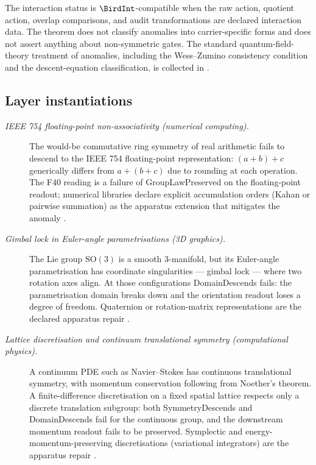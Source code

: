 \documentclass[11pt]{article}
\theoremstyle{definition}
\begin{document}
The interaction status is \(\BirdInt\)-compatible when the raw action,
quotient action, overlap comparisons, and audit transformations are
declared interaction data.  The theorem does not classify anomalies
into carrier-specific forms and does not assert anything about
non-symmetric gates.  The standard quantum-field-theory treatment of
anomalies, including the Wess--Zumino consistency condition and the
descent-equation classification, is collected in
\citet{Bertlmann2000Anomalies}.

\subsection*{Layer instantiations}\label{layer-inst:F40}

\begin{description}
\item[\emph{{IEEE} 754 floating-point non-associativity (numerical
computing).}]
The would-be commutative ring symmetry of real arithmetic fails to
descend to the IEEE 754 floating-point representation:
\((a+b)+c\) generically differs from \(a+(b+c)\) due to rounding
at each operation.  The F40 reading is a failure of
GroupLawPreserved on the floating-point readout; numerical
libraries declare explicit accumulation orders (Kahan or
pairwise summation) as the apparatus extension that mitigates the
anomaly
\citep{IEEE7542019FloatingPoint}.

\item[\emph{Gimbal lock in Euler-angle parametrisations
(3D graphics).}]
The Lie group \(\mathrm{SO}(3)\) is a smooth 3-manifold, but its
Euler-angle parametrisation has coordinate singularities --- gimbal
lock --- where two rotation axes align.  At those configurations
DomainDescends fails: the parametrisation domain breaks down and
the orientation readout loses a degree of freedom.  Quaternion or
rotation-matrix representations are the declared apparatus repair
\citep{Kuipers1999QuaternionsRotationSequences}.

\item[\emph{Lattice discretisation and continuum
translational symmetry (computational physics).}]
A continuum PDE such as Navier--Stokes has continuous translational
symmetry, with momentum conservation following from Noether's
theorem.  A finite-difference discretisation on a fixed spatial
lattice respects only a discrete translation subgroup: both
SymmetryDescends and DomainDescends fail for the continuous group,
and the downstream momentum readout fails to be preserved.
Symplectic and energy-momentum-preserving discretisations
(variational integrators) are the apparatus repair
\citep{HairerLubichWanner2006GeometricNumerical}.


\end{description}
\end{document}
